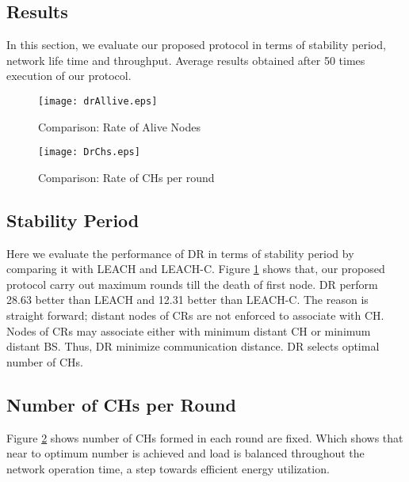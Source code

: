 \documentclass[3p,times,procedia]{elsarticle}
\begin{document}
\subsection{Results}        In this section, we evaluate our proposed protocol in terms of stability period, network life time and throughput. Average results obtained after 50 times execution of our protocol.


\begin{figure}[t]       \centering
\texttt{[image: drAllive.eps]}
\caption{Comparison: Rate of Alive Nodes}
\label{drAllive}
\end{figure}



\begin{figure}[H]       \centering
\texttt{[image: DrChs.eps]}
\caption{Comparison: Rate of CHs per round}
\label{DrChs}
\end{figure}

\subsection{Stability Period}    Here we evaluate the performance of DR in terms of stability period by comparing it with LEACH and LEACH-C. Figure \ref{drAllive} shows that, our proposed protocol carry out maximum rounds till the death of first node. DR perform 28.63 better than LEACH and 12.31 better than LEACH-C. The reason is straight forward; distant nodes of CRs are not enforced to associate with CH. Nodes of CRs may associate either with minimum distant CH or minimum distant BS. Thus, DR minimize communication distance. DR selects optimal number of CHs.

\subsection{Number of CHs per Round}
Figure \ref{DrChs} shows number of CHs formed in each round are fixed. Which shows that near to optimum number is achieved and load is balanced throughout the network operation time, a step towards efficient energy utilization.
\end{document}
